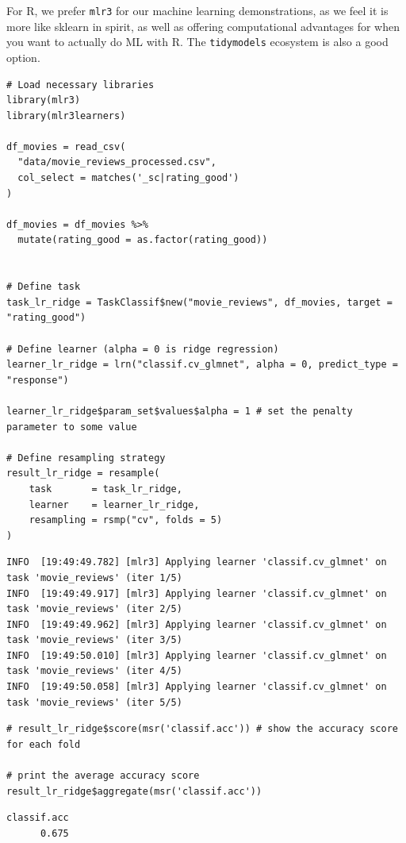 \documentclass[
  letterpaper,
]{krantz}
\begin{document}
For R, we prefer \texttt{mlr3} for our machine learning demonstrations,
as we feel it is more like sklearn in spirit, as well as offering
computational advantages for when you want to actually do ML with R. The
\texttt{tidymodels} ecosystem is also a good option.

\begin{verbatim}
# Load necessary libraries
library(mlr3)
library(mlr3learners)

df_movies = read_csv(
  "data/movie_reviews_processed.csv", 
  col_select = matches('_sc|rating_good')
)

df_movies = df_movies %>% 
  mutate(rating_good = as.factor(rating_good))


# Define task
task_lr_ridge = TaskClassif$new("movie_reviews", df_movies, target = "rating_good")

# Define learner (alpha = 0 is ridge regression)
learner_lr_ridge = lrn("classif.cv_glmnet", alpha = 0, predict_type = "response")

learner_lr_ridge$param_set$values$alpha = 1 # set the penalty parameter to some value

# Define resampling strategy
result_lr_ridge = resample(
    task       = task_lr_ridge,
    learner    = learner_lr_ridge,
    resampling = rsmp("cv", folds = 5)
)
\end{verbatim}

\begin{verbatim}
INFO  [19:49:49.782] [mlr3] Applying learner 'classif.cv_glmnet' on task 'movie_reviews' (iter 1/5)
INFO  [19:49:49.917] [mlr3] Applying learner 'classif.cv_glmnet' on task 'movie_reviews' (iter 2/5)
INFO  [19:49:49.962] [mlr3] Applying learner 'classif.cv_glmnet' on task 'movie_reviews' (iter 3/5)
INFO  [19:49:50.010] [mlr3] Applying learner 'classif.cv_glmnet' on task 'movie_reviews' (iter 4/5)
INFO  [19:49:50.058] [mlr3] Applying learner 'classif.cv_glmnet' on task 'movie_reviews' (iter 5/5)
\end{verbatim}

\begin{verbatim}
# result_lr_ridge$score(msr('classif.acc')) # show the accuracy score for each fold

# print the average accuracy score
result_lr_ridge$aggregate(msr('classif.acc'))
\end{verbatim}

\begin{verbatim}
classif.acc 
      0.675 
\end{verbatim}
\end{document}
